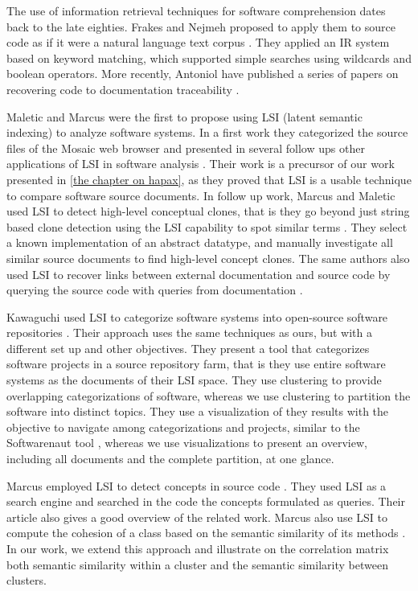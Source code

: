 The use of information retrieval techniques for software comprehension dates back to the late eighties. Frakes and Nejmeh proposed to apply them to source code as if it were a natural language text corpus \cite{Frak87a}. They applied an IR system based on keyword matching, which supported simple searches using wildcards and boolean operators. More recently, Antoniol \etal have published a series of papers on recovering code to documentation traceability \cite{Anto00c,Anto02b}. 

Maletic and Marcus were the first to propose using LSI (latent semantic indexing) to analyze software systems. In a first work they categorized the source files of the Mosaic web browser and presented in several follow ups other applications of LSI in software analysis \cite{Male00a}. Their work is a precursor of our work presented  in \autoref{the chapter on hapax}, as they proved that LSI is a usable technique to compare software source documents. In follow up work, Marcus and Maletic used LSI to detect high-level conceptual clones, that is they go beyond just string based clone detection using the LSI capability to spot similar terms \cite{Marc01a}. They
select a known implementation of an abstract datatype, and manually investigate all similar source documents to find high-level concept clones. The same authors also used LSI to recover links between external documentation and source code by querying the source code with queries from documentation \cite{Marc03b}.

Kawaguchi \etal used LSI to categorize software systems into open-source software repositories \cite{Kawa04a}. Their approach uses the same techniques as ours, but with a different set up and other objectives. They present a tool that categorizes software projects in a source repository farm, that is they use entire software systems as the documents of their LSI space. They use clustering to provide overlapping categorizations of software, whereas we use clustering to partition the software into distinct topics. They use a visualization of they results with the objective to navigate among categorizations and projects, similar to the Softwarenaut tool \cite{Lung06a}, whereas we use visualizations to present an overview, including all documents and the complete partition, at one glance.

Marcus \etal employed LSI to detect concepts in source code \cite{Marc04a}. They used LSI as a search engine and searched in the code the concepts formulated as queries. Their  article also gives a good overview of the related work. Marcus \etal also use LSI to compute the cohesion of a class based on the semantic similarity of its methods \cite{Marc05a}. In our work, we extend this approach and illustrate on the correlation matrix both semantic similarity within a cluster and the semantic similarity between clusters.


